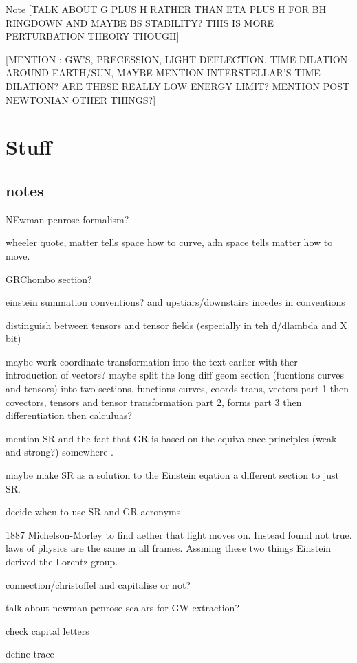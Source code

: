 Note [TALK ABOUT G PLUS H RATHER THAN ETA PLUS H FOR BH RINGDOWN AND MAYBE BS STABILITY? THIS IS MORE PERTURBATION THEORY THOUGH]




[MENTION : GW'S, PRECESSION, LIGHT DEFLECTION, TIME DILATION AROUND EARTH/SUN, MAYBE MENTION INTERSTELLAR'S TIME DILATION? ARE THESE REALLY LOW ENERGY LIMIT? MENTION POST NEWTONIAN OTHER THINGS?]




\section{Stuff}
\subsection{notes}

NEwman penrose formalism? 

wheeler quote, matter tells space how to curve, adn space tells matter how to move.

GRChombo section?

einstein summation conventions? and upstiars/downstairs incedes in conventions

distinguish between tensors and tensor fields (especially in teh d/dlambda and X bit)

maybe work coordinate transformation into the text earlier with ther introduction of vectors? maybe split the long diff geom section (fucntions curves and tensors) into two sections, functions curves, coords trans, vectors part 1 then covectors, tensors and tensor transformation part 2, forms part 3 then differentiation then calculuas?

mention SR and the fact that GR is based on the equivalence principles (weak and strong?) somewhere .

maybe make SR as a solution to the Einstein eqation a different section to just SR.

decide when to use SR and GR acronyms

1887 Michelson-Morley to find aether that light moves on. Instead found not true. laws of physics are the same in all frames. Assming these two things Einstein derived the Lorentz group.

connection/christoffel and capitalise or not?

talk about newman penrose scalars for GW extraction?

check capital letters

define trace


